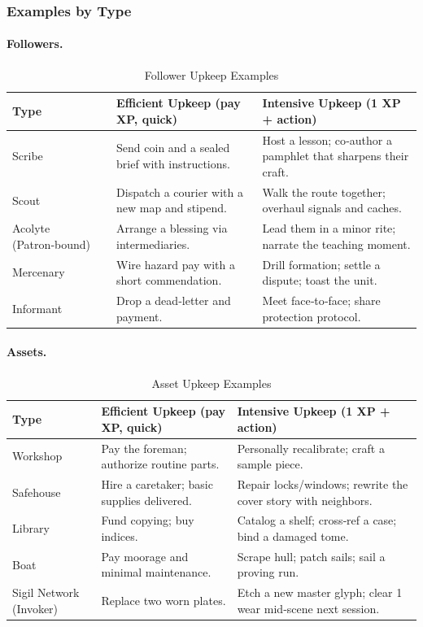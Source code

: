 \subsubsection{Examples by Type}\label{subsec:upkeep_examples}

\paragraph{Followers.}
\begin{longtable}{p{2.5cm} p{5cm} p{5cm}}
\caption{Follower Upkeep Examples}\label{tab:follower_upkeep}\\
\toprule
\textbf{Type} & \textbf{Efficient Upkeep (pay XP, quick)} & \textbf{Intensive Upkeep (1 XP + action)} \\
\midrule
Scribe & Send coin and a sealed brief with instructions. & Host a lesson; co‑author a pamphlet that sharpens their craft. \\
Scout & Dispatch a courier with a new map and stipend. & Walk the route together; overhaul signals and caches. \\
Acolyte (Patron‑bound) & Arrange a blessing via intermediaries. & Lead them in a minor rite; narrate the teaching moment. \\
Mercenary & Wire hazard pay with a short commendation. & Drill formation; settle a dispute; toast the unit. \\
Informant & Drop a dead‑letter and payment. & Meet face‑to‑face; share protection protocol. \\
\bottomrule
\end{longtable}

\paragraph{Assets.}
\begin{longtable}{p{2.5cm} p{5cm} p{5cm}}
\caption{Asset Upkeep Examples}\label{tab:asset_upkeep}\\
\toprule
\textbf{Type} & \textbf{Efficient Upkeep (pay XP, quick)} & \textbf{Intensive Upkeep (1 XP + action)} \\
\midrule
Workshop & Pay the foreman; authorize routine parts. & Personally recalibrate; craft a sample piece. \\
Safehouse & Hire a caretaker; basic supplies delivered. & Repair locks/windows; rewrite the cover story with neighbors. \\
Library & Fund copying; buy indices. & Catalog a shelf; cross‑ref a case; bind a damaged tome. \\
Boat & Pay moorage and minimal maintenance. & Scrape hull; patch sails; sail a proving run. \\
Sigil Network (Invoker) & Replace two worn plates. & Etch a new master glyph; clear 1 wear mid‑scene next session. \\
\bottomrule
\end{longtable}

